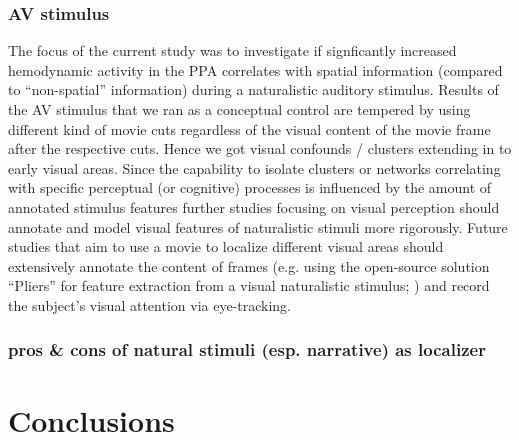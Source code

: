 \documentclass[english]{article}
\begin{document}
\subsubsection{AV stimulus}


The focus of the current study was to investigate if signficantly increased
hemodynamic activity in the PPA correlates with spatial information (compared to
``non-spatial'' information) during a naturalistic auditory stimulus.
Results of the AV stimulus that we ran as a conceptual control are tempered by
using different kind of movie cuts regardless of the visual content of the movie
frame after the respective cuts.
Hence we got visual confounds / clusters extending in to early visual areas.
Since the capability to isolate clusters or networks correlating with specific
perceptual (or cognitive) processes is influenced by the amount of annotated
stimulus features further studies focusing on visual perception should annotate
and model visual features of naturalistic stimuli more rigorously.
Future studies that aim to use a movie to localize different visual areas should
extensively annotate the content of frames (e.g. using the open-source solution
``Pliers'' for feature extraction from a visual naturalistic stimulus;
\citep{mcnamara2017developing}) and record the subject's visual attention via
eye-tracking.


\subsubsection{pros \& cons of natural stimuli (esp. narrative) as localizer}





\section{Conclusions}

\end{document}
